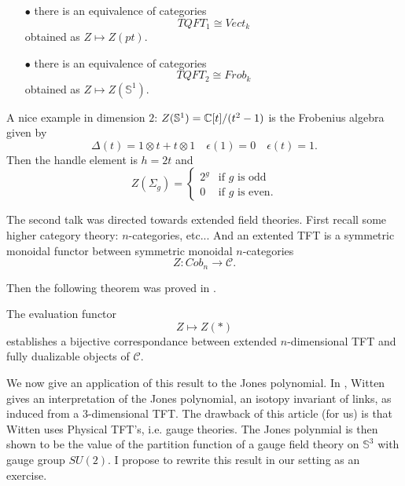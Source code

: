 \begin{itemize}
\item[$\bullet$] there is an equivalence of categories 
\[TQFT_1 \cong Vect_k \]
obtained as $Z \mapsto Z(pt)$.
\item[$\bullet$] there is an equivalence of categories 
\[TQFT_2 \cong Frob_k  \]
obtained as $Z \mapsto Z(\mathbb S^1)$.\\
\end{itemize}

A nice example in dimension $2$: $Z(\mathbb S^1)=\mathbb C [t]/ (t^2 -1 )$ is the Frobenius algebra given by
\[\Delta(t) = 1\otimes t + t\otimes 1 \quad \epsilon(1)=0 \quad \epsilon (t) =1.\]
Then the handle element is $h=2t$ and
\[ Z(\Sigma_g) = \left\{\begin{array}{ll} 
2^g & \text{if }g\text{ is odd} \\
0 & \text{if }g\text{ is even.}
\end{array}\right.\]  

The second talk was directed towards extended field theories. First recall some higher category theory: $n$-categories, etc... And an extented TFT is a symmetric monoidal functor between symmetric monoidal $n$-categories
\[Z : Cob_n \rightarrow \mathcal C.\]

Then the following theorem was proved in \cite{Lurie}.

\begin{thm}
The evaluation functor \[ Z \mapsto Z(*)\] establishes a bijective correspondance between extended $n$-dimensional TFT and fully dualizable objects of $\mathcal C$. 
\end{thm}

We now give an application of this result to the Jones polynomial. In \cite{WittenJones}, Witten gives an interpretation of the Jones polynomial, an isotopy invariant of links, as induced from a $3$-dimensional TFT. The drawback of this article (for us) is that Witten uses Physical TFT's, i.e. gauge theories. The Jones polynmial is then shown to be the value of the partition function of a gauge field theory on $\mathbb S^3$ with gauge group $SU(2)$. I propose to rewrite this result in our setting as an exercise. \\  

